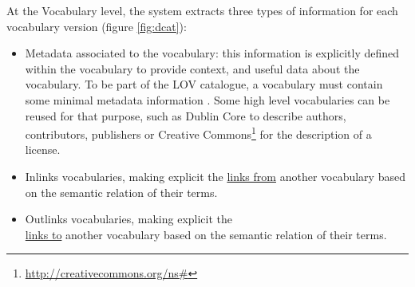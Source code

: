 \documentclass{iosart2c}
\begin{document}
At the Vocabulary level, the system extracts three types of information for each vocabulary version (figure \ref{fig:dcat}):
\begin{itemize}
\item Metadata associated to the vocabulary: this information is explicitly defined within the vocabulary to provide context, and useful data about the vocabulary. To be part of the LOV catalogue, a vocabulary must contain some minimal metadata information \cite{vandenbussche2011metadata}. Some high level vocabularies can be reused for that purpose, such as Dublin Core to describe authors, contributors, publishers or Creative Commons\footnote{\url{http://creativecommons.org/ns#}} for the description of a license.

\item Inlinks vocabularies, making explicit the \underline{links from} another vocabulary based on the semantic relation of their terms.

\item Outlinks vocabularies, making explicit the\\ \underline{links to} another vocabulary based on the semantic relation of their terms.
\end{itemize}
\end{document}
